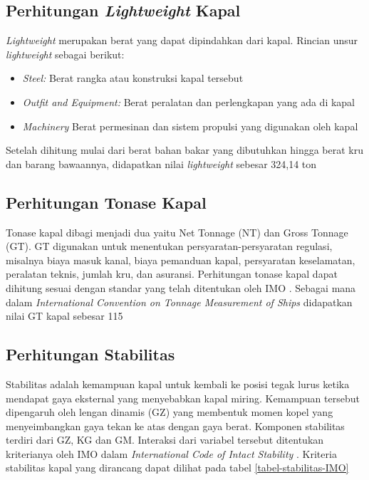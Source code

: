 \subsection{Perhitungan \emph{Lightweight} Kapal}
\label{subsec:perhitungan-lwt}

\emph{Lightweight} merupakan berat yang dapat dipindahkan dari kapal. Rincian unsur \emph{lightweight} sebagai berikut:
\begin{itemize}
    \item \emph{Steel:} Berat rangka atau konstruksi kapal tersebut
    \item \emph{Outfit and Equipment:} Berat peralatan dan perlengkapan yang ada di kapal  
    \item \emph{Machinery} Berat permesinan dan sistem propulsi yang digunakan oleh kapal
\end{itemize}

Setelah dihitung mulai dari berat bahan bakar yang dibutuhkan hingga berat kru dan barang bawaannya, didapatkan nilai \emph{lightweight} sebesar 324,14 ton


\subsection{Perhitungan Tonase Kapal}
\label{subsec:perhitungan-gt}

Tonase kapal dibagi menjadi dua yaitu Net Tonnage (NT) dan Gross Tonnage (GT).  GT digunakan untuk menentukan persyaratan-persyaratan regulasi, misalnya biaya masuk kanal, biaya pemanduan kapal, persyaratan keselamatan, peralatan teknis, jumlah kru, dan asuransi. Perhitungan tonase kapal dapat dihitung sesuai dengan standar yang telah ditentukan oleh IMO \citep{Organization_1983}. Sebagai mana dalam \emph{International Convention on Tonnage Measurement of Ships} didapatkan nilai GT kapal sebesar 115


\subsection{Perhitungan Stabilitas}
\label{subsec:stabilitas}

Stabilitas adalah kemampuan kapal untuk kembali ke posisi tegak lurus ketika mendapat gaya eksternal yang menyebabkan kapal miring. Kemampuan tersebut dipengaruh oleh lengan dinamis (GZ)
yang membentuk momen kopel yang menyeimbangkan gaya tekan ke atas dengan gaya berat. Komponen stabilitas terdiri dari GZ, KG dan GM. Interaksi dari variabel tersebut ditentukan kriterianya oleh IMO dalam \emph{International Code of Intact Stability} \citep{Organization_2009}. Kriteria stabilitas kapal yang dirancang dapat dilihat pada tabel \ref{tabel-stabilitas-IMO}

